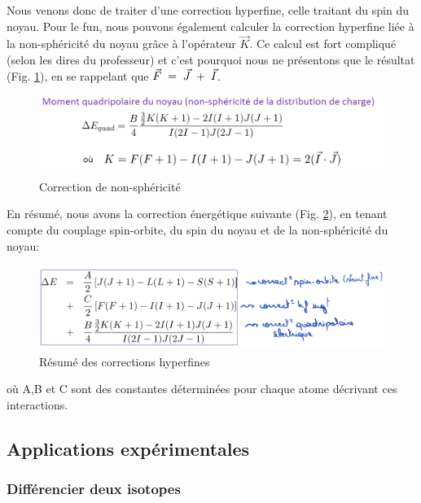 Nous venons donc de traiter d'une correction hyperfine, celle traitant du spin du noyau. Pour le fun, nous pouvons également calculer la correction hyperfine liée à la non-sphéricité du noyau grâce à l'opérateur $\vec{K}$. Ce calcul est fort compliqué (selon les dires du professeur) et c'est pourquoi nous ne présentons que le résultat (Fig. \ref{fig:eq_correcK}), en se rappelant que $\vec{F} \; = \; \vec{J} \; + \; \vec{I}$.
\begin{figure}[htp]
    \centering
    \includegraphics[scale=0.80]{Images2/CorrecK.PNG}
    \caption{Correction de non-sphéricité}
    \label{fig:eq_correcK}
\end{figure}
En résumé, nous avons la correction énergétique suivante (Fig. \ref{fig:eq_resume_correct}), en tenant compte du couplage spin-orbite, du spin du noyau et de la non-sphéricité du noyau:
\begin{figure}[htp]
    \centering
    \includegraphics[scale=0.80]{Images2/résuméCorrec.PNG}
    \caption{Résumé des corrections hyperfines}
    \label{fig:eq_resume_correct}
\end{figure}
où A,B et C sont des constantes déterminées pour chaque atome décrivant ces interactions.


\newpage
\subsection{Applications expérimentales}
\subsubsection{Différencier deux isotopes}



